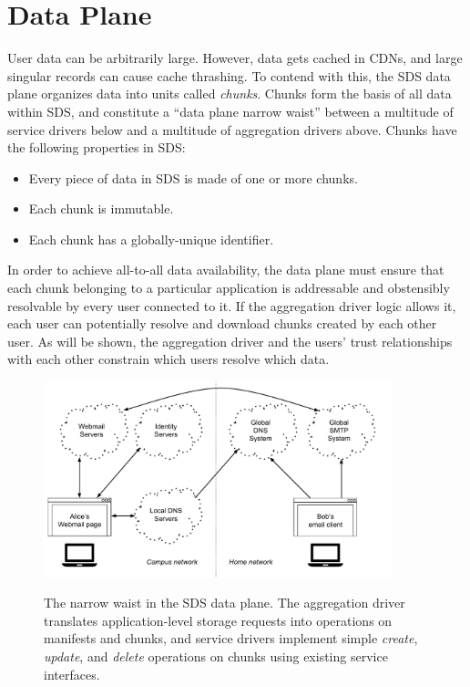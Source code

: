 \section{Data Plane}

User data can be arbitrarily large.  However, data gets cached in CDNs, and
large singular records can cause cache thrashing.  To contend with this,
the SDS data plane organizes data into units called \emph{chunks}.  Chunks form
the basis of all data within SDS, and constitute a ``data plane narrow waist'' between 
a multitude of service drivers below and a multitude of aggregation drivers
above.  Chunks have the following properties in SDS:

\begin{itemize}
    \item Every piece of data in SDS is made of one or more chunks.
    \item Each chunk is immutable.
    \item Each chunk has a globally-unique identifier.
\end{itemize}

In order to achieve all-to-all data availability, the 
data plane must ensure that each chunk belonging to a particular application
is addressable and obstensibly resolvable by every user connected to it.
If the aggregation driver logic allows it, each user
can potentially resolve and download chunks created by each other user.
As will be shown, the aggregation driver and the users' trust relationships with
each other constrain which users resolve which data.

\begin{figure}[h]
   \caption{The narrow waist in the SDS data plane.  The aggregation driver
   translates application-level storage requests into operations on manifests
   and chunks, and service drivers implement simple \textit{create},
   \textit{update}, and \textit{delete} operations on chunks using existing
   service interfaces.}
   \centering
   \includegraphics[width=0.9\textwidth,page=4]{figures/dissertation-figures}
   \label{fig:chap2-narrow-waist}
\end{figure}

